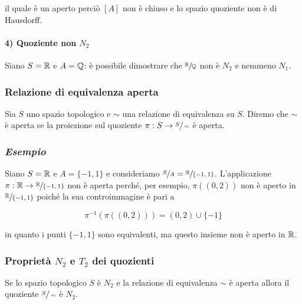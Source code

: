 il quale è un aperto perciò $ [A] $ non è chiuso e lo spazio quoziente non è di Hausdorff.

\paragraph{4) Quoziente non $ N_{2} $}

Siano $ S = \mathbb{R} $ e $ A = \mathbb{Q} $: è possibile dimostrare che $ \sfrac{\mathbb{R}}{\mathbb{Q}} $ non è $ N_{2} $ e nemmeno $ N_{1} $.

\subsubsection{Relazione di equivalenza aperta}

Sia $ S $ uno spazio topologico e $ \sim $ una relazione di equivalenza su $ S $. Diremo che $ \sim $ è aperta se la proiezione sul quoziente $ \pi : S \to \sfrac{S}{\sim} $ è aperta.

\subsubsection{\textit{Esempio}}

Siano $ S = \mathbb{R} $ e $ A = \{-1,1\} $ e consideriamo $ \sfrac{S}{A} = \sfrac{\mathbb{R}}{\{-1,1\}} $. L'applicazione $ \pi : \mathbb{R} \to \sfrac{\mathbb{R}}{\{-1,1\}} $ non è aperta perché, per esempio, $ \pi((0,2)) $ non è aperto in $ \sfrac{\mathbb{R}}{\{-1,1\}} $ poiché la sua controimmagine è pari a

\begin{equation}
	\pi^{-1}(\pi((0,2))) = (0,2) \cup \{-1\}
\end{equation}

in quanto i punti $ \{-1,1\} $ sono equivalenti, ma questo insieme non è aperto in $ \mathbb{R} $.

\subsubsection{Proprietà $ N_{2} $ e $ T_{2} $ dei quozienti}

\begin{definition}\label{prop:n2-open-quot}
	Se lo spazio topologico $ S $ è $ N_{2} $ e la relazione di equivalenza $ \sim $ è aperta allora il quoziente $ \sfrac{S}{\sim} $ è $ N_{2} $.
\end{definition}

